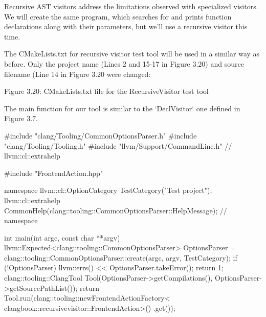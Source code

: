 Recursive AST visitors address the limitations observed with specialized visitors. We will create the same program, which searches for and prints function declarations along with their parameters, but we'll use a recursive visitor this time.

The CMakeLists.txt for recursive visitor test tool will be used in a similar way as before. Only the project name (Lines 2 and 15-17 in Figure 3.20) and source filename (Line 14 in Figure 3.20 were changed:


\begin{center}
Figure 3.20: CMakeLists.txt file for the RecursiveVisitor test tool
\end{center}

The main function for our tool is similar to the ‘DeclVisitor‘ one defined in Figure 3.7.

\begin{cpp}
#include "clang/Tooling/CommonOptionsParser.h"
#include "clang/Tooling/Tooling.h"
#include "llvm/Support/CommandLine.h" // llvm::cl::extrahelp

#include "FrontendAction.hpp"

namespace {
llvm::cl::OptionCategory TestCategory("Test project");
llvm::cl::extrahelp
  CommonHelp(clang::tooling::CommonOptionsParser::HelpMessage);
} // namespace

int main(int argc, const char **argv) {
  llvm::Expected<clang::tooling::CommonOptionsParser> OptionsParser =
    clang::tooling::CommonOptionsParser::create(argc, argv, TestCategory);
  if (!OptionsParser) {
    llvm::errs() << OptionsParser.takeError();
    return 1;
  }
  clang::tooling::ClangTool Tool(OptionsParser->getCompilations(),
                                 OptionsParser->getSourcePathList());
  return Tool.run(clang::tooling::newFrontendActionFactory<
                    clangbook::recursivevisitor::FrontendAction>()
                    .get());
}
\end{cpp}


